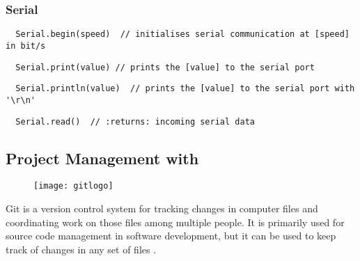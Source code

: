 \subsubsection*{Serial}
\begin{verbatim}
  Serial.begin(speed)  // initialises serial communication at [speed] in bit/s
\end{verbatim}
\vspace*{-2ex}
\begin{verbatim}
  Serial.print(value) // prints the [value] to the serial port
\end{verbatim}
\vspace*{-2ex}
\begin{verbatim}
  Serial.println(value)  // prints the [value] to the serial port with '\r\n'
\end{verbatim}
\vspace*{-2ex}
\begin{verbatim}
  Serial.read()  // :returns: incoming serial data
\end{verbatim}
%
\subsection{Project Management with}\label{sec:git}
%
\begin{figure}[h!]\vspace*{-1.43cm}\hspace*{6.7cm}\texttt{[image: gitlogo]}\end{figure}\vspace*{-.4cm}\noindent
%
Git is a version control system for tracking changes in computer files and coordinating work on those files among multiple people. It is primarily used for source code management in software development, but it can be used to keep track of changes in any set of files \cite{git}.\par
%
